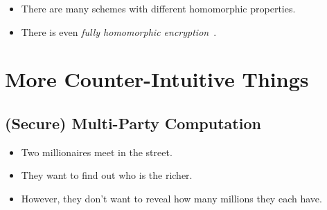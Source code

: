 \begin{frame}
  \begin{remark}
    \begin{itemize}
      \item There are many schemes with different homomorphic properties.
      \item There is even \emph{fully homomorphic 
          encryption}~\cite{GentryFullyHomomorphicEncryption}.
    \end{itemize}
  \end{remark}
\end{frame}


\section{More Counter-Intuitive Things}

\subsection{(Secure) Multi-Party Computation}

\begin{frame}
  \begin{example}
    \begin{itemize}
      \item Two millionaires meet in the street.
      \item They want to find out who is the richer.

        \pause{}

      \item However, they don't want to reveal how many millions they each 
        have.
    \end{itemize}
  \end{example}
\end{frame}

